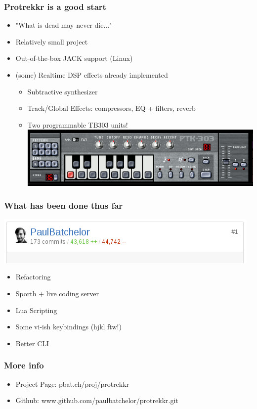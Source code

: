 \documentclass{beamer}
\begin{document}
\begin{frame}
\frametitle{Protrekkr is a good start}
\begin{itemize}
    \item{"What is dead may never die..."}
    \item{Relatively small project}
    \item{Out-of-the-box JACK support (Linux)}
    \item{(some) Realtime DSP effects already implemented}
    \begin{itemize}
    \item{Subtractive synthesizer}
    \item{Track/Global Effects: compressors, EQ + filters, reverb}
    \item{Two programmable TB303 units!  \break \break
        \includegraphics[scale=0.3]{tb303}
    }
    \end{itemize}
\end{itemize}

\end{frame}

\begin{frame}
\frametitle{What has been done thus far}
\includegraphics[scale=0.4]{git}
\begin{itemize}
    \item{Refactoring}
    \item{Sporth + live coding server}
    \item{Lua Scripting}
    \item{Some vi-ish keybindings (hjkl ftw!)}
    \item{Better CLI}
\end{itemize}
\end{frame}


\begin{frame}
\frametitle{More info}
\begin{itemize}
    \item{Project Page: pbat.ch/proj/protrekkr}
    \item{Github: www.github.com/paulbatchelor/protrekkr.git}
\end{itemize}
\end{frame}
\end{document}
